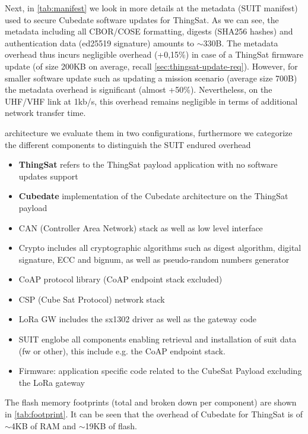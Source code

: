 Next, in \autoref{tab:manifest} we look in more details at the metadata (SUIT manifest) used to secure Cubedate software updates for ThingSat.
As we can see, the metadata including all CBOR/COSE formatting, digests (SHA256 hashes) and authentication data (ed25519 signature) amounts to $\sim$330B.
The metadata overhead thus incurs negligible overhead (+0,15\%) in case of a ThingSat firmware update (of size 200KB on average, recall
\autoref{sec:thingsat-update-req}). However, for smaller software update such as updating a mission scenario (average size 700B) the metadata
overhead is significant (almost +50\%). Nevertheless, on the UHF/VHF link at 1kb/s, this overhead remains negligible in terms of additional
network transfer time.

\iffalse

architecture we evaluate them
in two configurations, furthermore we categorize the different components to
distinguish the SUIT endured overhead

\begin{itemize}
    \item \textbf{ThingSat} refers to the ThingSat payload application with no
    software updates support
    \item \textbf{Cubedate} implementation of the Cubedate architecture on the
    ThingSat payload
    \item CAN (Controller Area Network) stack as well as low level interface
    \item Crypto includes all cryptographic algorithms such as digest algorithm, digital
    signature, ECC and bignum, as well as pseudo-random numbers generator
    \item CoAP protocol library (CoAP endpoint stack excluded)
    \item CSP (Cube Sat Protocol) network stack
    \item LoRa GW includes the sx1302 driver as well as the gateway code
    \item SUIT englobe all components enabling retrieval and installation of suit data
    (fw or other), this include e.g. the CoAP endpoint stack.
    \item Firmware: application specific code related to the CubeSat Payload excluding
    the LoRa gateway
\end{itemize}

The flash memory footprints (total and broken down per component) are shown in
\autoref{tab:footprint}. It can be seen that the overhead of Cubedate for ThingSat
is of $\sim$4KB of RAM and $\sim$19KB of flash.

